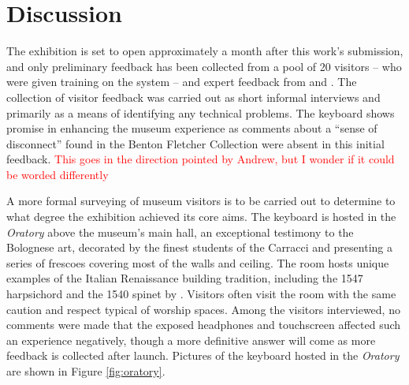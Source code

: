 \section{Discussion}\label{context}

The exhibition is set to open approximately a month after this work's submission, and only preliminary feedback has been collected from a pool of 20 visitors -- who were given training on the system -- and expert feedback from  and .
The collection of visitor feedback was carried out as short informal interviews and primarily as a means of identifying any technical problems.
The keyboard shows promise in enhancing the museum experience as comments about a ``sense of disconnect'' found in the Benton Fletcher Collection \cite{McAlpine2014} were absent in this initial feedback. \textcolor{red}{This goes in the direction pointed by Andrew, but I wonder if it could be worded differently}


A more formal surveying of museum visitors is to be carried out to determine to what degree the exhibition achieved its core aims.
The keyboard is hosted in the \emph{Oratory} above the museum's main hall, an exceptional testimony to the Bolognese art, decorated by the finest students of the Carracci and presenting a series of frescoes covering most of the walls and ceiling. The room hosts unique examples of the Italian Renaissance building tradition, including the 1547 harpsichord and the 1540 spinet by . Visitors often visit the room with the same caution and respect typical of worship spaces. Among the visitors interviewed, no comments were made that the exposed headphones and touchscreen affected such an experience negatively, though a more definitive answer will come as more feedback is collected after launch. Pictures of the keyboard hosted in the \emph{Oratory} are shown in Figure \ref{fig:oratory}.

